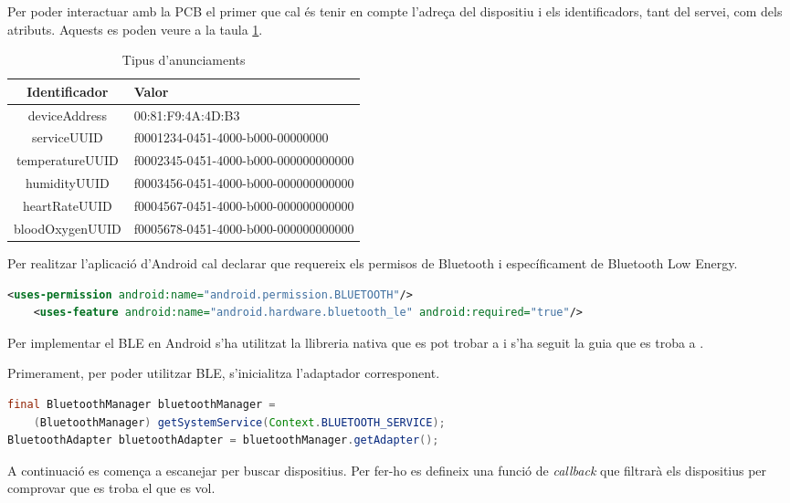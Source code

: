 Per poder interactuar amb la PCB el primer que cal és tenir en compte l'adreça del dispositiu i els identificadors, tant del servei, com dels atributs.
Aquests es poden veure a la taula \ref{taula_app}.

\begin{table}[!h]
	\begin{center}
		\begin{tabular}{|c|l|}
			\hline
			Identificador	&	Valor	\\	\hline
			deviceAddress	&	00:81:F9:4A:4D:B3	\\	\hline
			serviceUUID		&	f0001234-0451-4000-b000-00000000		\\	\hline
			temperatureUUID	&	f0002345-0451-4000-b000-000000000000	\\	\hline
			humidityUUID	&	f0003456-0451-4000-b000-000000000000	\\	\hline
			heartRateUUID	&	f0004567-0451-4000-b000-000000000000	\\	\hline
			bloodOxygenUUID	&	f0005678-0451-4000-b000-000000000000	\\	\hline
		\end{tabular}
		\label{taula_app}
	\end{center}
	\caption{Tipus d'anunciaments}
\end{table}

Per realitzar l'aplicació d'Android cal declarar que requereix els permisos de Bluetooth i específicament de Bluetooth Low Energy.

\begin{lstlisting}[language=xml]
	<uses-permission android:name="android.permission.BLUETOOTH"/>
	<uses-feature android:name="android.hardware.bluetooth_le" android:required="true"/>
\end{lstlisting}

Per implementar el BLE en Android s'ha utilitzat la llibreria nativa que es pot trobar a \cite{ble_library} i s'ha seguit la guia que es troba a \cite{ble_overview}.

Primerament, per poder utilitzar BLE, s'inicialitza l'adaptador corresponent.

\begin{lstlisting}[language=java]
final BluetoothManager bluetoothManager =
	(BluetoothManager) getSystemService(Context.BLUETOOTH_SERVICE);
BluetoothAdapter bluetoothAdapter = bluetoothManager.getAdapter();
\end{lstlisting}

A continuació es comença a escanejar per buscar dispositius.
Per fer-ho es defineix una funció de \textit{callback} que filtrarà els dispositius per comprovar que es troba el que es vol.

